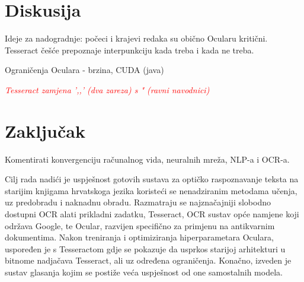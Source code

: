 \documentclass[zavrsnirad]{fer}
\begin{document}
\chapter{Diskusija}
\label{pog:diskusija}

Ideje za nadogradnje: počeci i krajevi redaka su obično Ocularu kritični. Tesseract češće prepoznaje interpunkciju kada treba i kada ne treba.

Ograničenja Oculara - brzina, CUDA (java)

\textcolor{red}{\textit{Tesseract zamjena ',,' (dva zareza) s " (ravni navodnici)}}


\chapter{Zaključak}
\label{pog:zakljucak}

Komentirati konvergenciju računalnog vida, neuralnih mreža, NLP-a i OCR-a.








\begin{sazetak}
  Cilj rada nadići je uspješnost gotovih sustava za optičko raspoznavanje teksta na starijim knjigama hrvatskoga jezika koristeći se nenadziranim metodama učenja, uz predobradu i naknadnu obradu. Razmatraju se najznačajniji slobodno dostupni OCR alati prikladni zadatku, Tesseract, OCR sustav opće namjene koji održava Google, te Ocular, razvijen specifično za primjenu na antikvarnim dokumentima. Nakon treniranja i optimiziranja hiperparametara Oculara, uspoređen je s Tesseractom gdje se pokazuje da usprkos starijoj arhitekturi u bitnome nadjačava Tesseract, ali uz određena ograničenja. Konačno, izveden je sustav glasanja kojim se postiže veća uspješnost od one samostalnih modela.
\end{sazetak}
\end{document}
